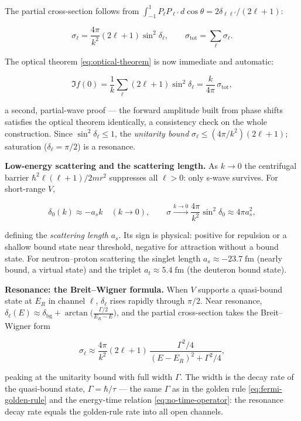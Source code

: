 The partial cross-section follows from $\int_{-1}^{1}P_{\ell}P_{\ell'}\,d\!\cos\theta=2\delta_{\ell\ell'}/(2\ell+1)$:
\begin{linenomath}
\begin{equation}
\sigma_{\ell}=\frac{4\pi}{k^{2}}(2\ell+1)\sin^{2}\delta_{\ell},\qquad \sigma_{\mathrm{tot}}=\sum_{\ell}\sigma_{\ell}.
\label{eq:partial-cross-section}
\end{equation}
\end{linenomath}
The optical theorem \eqref{eq:optical-theorem} is now immediate and automatic:
\begin{linenomath}
\begin{equation*}
\Im f(0)=\frac{1}{k}\sum_{\ell}(2\ell+1)\sin^{2}\delta_{\ell}=\frac{k}{4\pi}\,\sigma_{\mathrm{tot}},
\end{equation*}
\end{linenomath}
a second, partial-wave proof --- the forward amplitude built from phase shifts satisfies the optical theorem identically, a consistency check on the whole construction. Since $\sin^{2}\delta_{\ell}\le1$, the \emph{unitarity bound} $\sigma_{\ell}\le(4\pi/k^{2})(2\ell+1)$; saturation ($\delta_{\ell}=\pi/2$) is a resonance.

\medskip\noindent\textbf{Low-energy scattering and the scattering length.}
As $k\to0$ the centrifugal barrier $\hbar^{2}\ell(\ell+1)/2mr^{2}$ suppresses all $\ell>0$: only s-wave survives. For short-range $V$,
\begin{linenomath}
\begin{equation}
\delta_{0}(k)\approx -a_{s}k\quad(k\to0),\qquad \sigma\xrightarrow{k\to0}\frac{4\pi}{k^{2}}\sin^{2}\delta_{0}\approx 4\pi a_{s}^{2},
\label{eq:scattering-length}
\end{equation}
\end{linenomath}
defining the \emph{scattering length} $a_{s}$. Its sign is physical: positive for repulsion or a shallow bound state near threshold, negative for attraction without a bound state. For neutron--proton scattering the singlet length $a_{s}\approx-23.7\;\mathrm{fm}$ (nearly bound, a virtual state) and the triplet $a_{t}\approx5.4\;\mathrm{fm}$ (the deuteron bound state).

\medskip\noindent\textbf{Resonance: the Breit--Wigner formula.}
When $V$ supports a quasi-bound state at $E_{R}$ in channel $\ell$, $\delta_{\ell}$ rises rapidly through $\pi/2$. Near resonance, $\delta_{\ell}(E)\approx\delta_{\mathrm{bg}}+\arctan\!\bigl(\tfrac{\Gamma/2}{E_{R}-E}\bigr)$, and the partial cross-section takes the Breit--Wigner form
\begin{linenomath}
\begin{equation}
\sigma_{\ell}\approx\frac{4\pi}{k^{2}}(2\ell+1)\,\frac{\Gamma^{2}/4}{(E-E_{R})^{2}+\Gamma^{2}/4},
\label{eq:breit-wigner}
\end{equation}
\end{linenomath}
peaking at the unitarity bound with full width $\Gamma$. The width is the decay rate of the quasi-bound state, $\Gamma=\hbar/\tau$ --- the same $\Gamma$ as in the golden rule \eqref{eq:fermi-golden-rule} and the energy-time relation \eqref{eq:no-time-operator}: the resonance decay rate equals the golden-rule rate into all open channels.

